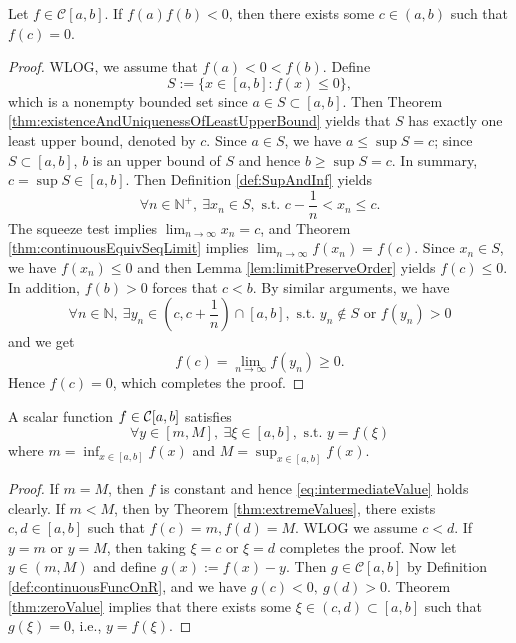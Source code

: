 \begin{thm}
  \label{thm:zeroValue}
  Let $f\in \mathcal{C}[a,b]$. If $f(a)f(b)<0$, then
  there exists some $c\in(a,b)$ such that $f(c)=0$.
\end{thm}
\begin{proof}
  WLOG, we assume that $f(a)<0<f(b)$. Define
  \begin{displaymath}
    S:=\{x\in[a,b]: f(x)\le 0\},
  \end{displaymath}
  which is a nonempty bounded set
  since $a\in S\subset [a,b]$.
  Then Theorem \ref{thm:existenceAndUniquenessOfLeastUpperBound} yields that
  $S$ has exactly one least upper bound, denoted by $c$.
  Since $a\in S$, we have $a\le \sup S=c$; since $S\subset[a,b]$,
  $b$ is an upper bound of $S$ and hence $b\ge\sup S=c$.
  In summary, $c=\sup S\in [a,b]$.
  Then Definition \ref{def:SupAndInf} yields
  \begin{displaymath}
    \forall n\in \mathbb{N}^{+},\
    \exists x_{n}\in S, \text{ s.t. }
    c-\frac{1}{n}< x_{n}\le c.
  \end{displaymath}
  The squeeze test implies $\lim_{n\rightarrow\infty}x_{n}=c$,
  and Theorem \ref{thm:continuousEquivSeqLimit} implies
  $\lim_{n\rightarrow\infty}f(x_{n})=f(c)$.
  Since $x_{n}\in S$, we have $f(x_{n})\le 0$ and then
  Lemma \ref{lem:limitPreserveOrder} yields $f(c)\le 0$.
  In addition, $f(b)>0$ forces that $c<b$.
  By similar arguments, we have
  \begin{displaymath}
    \forall n\in \mathbb{N},\
    \exists y_{n}\in \left(c,c+\frac{1}{n}\right)\cap[a,b],
    \text{ s.t. } y_{n}\not\in S \text{ or } f(y_{n})> 0
  \end{displaymath}
  and we get
  \begin{displaymath}
    f(c)=\lim_{n\rightarrow\infty}f(y_{n})\ge 0.
  \end{displaymath}
  Hence $f(c)=0$, which completes the proof.
\end{proof}

\begin{thm}
  \label{thm:intermediateValue}
  A scalar function $f\in {\cal C}[a,b]$ satisfies
  \begin{equation}
    \label{eq:intermediateValue}
    \forall y\in \left[m, M \right],\ 
    \exists \xi\in[a,b], \text{ s.t. }
    y=f(\xi)
  \end{equation}
  where  $m=\inf_{x\in[a,b]} f(x)$ and
   $M=\sup_{x\in[a,b]} f(x)$.
\end{thm}
\begin{proof}
  If $m=M$, then $f$ is constant and hence
  \eqref{eq:intermediateValue} holds clearly.
  If $m<M$, then by Theorem \ref{thm:extremeValues},
  there exists $c,d\in[a,b]$ such that
  $f(c)=m,f(d)=M$. WLOG we assume $c<d$.
  If $y=m$ or $y=M$, then taking $\xi=c$ or $\xi=d$ completes the proof.
  Now let $y\in(m,M)$ and
  define $g(x):=f(x)-y$. Then $g\in \mathcal{C}[a,b]$
  by Definition \ref{def:continuousFuncOnR}, and we have
  $g(c)<0,\ g(d)>0$. Theorem \ref{thm:zeroValue} implies
  that there exists some $\xi\in(c,d)\subset[a,b]$ such that
  $g(\xi)=0$, i.e., $y=f(\xi)$.
\end{proof}

